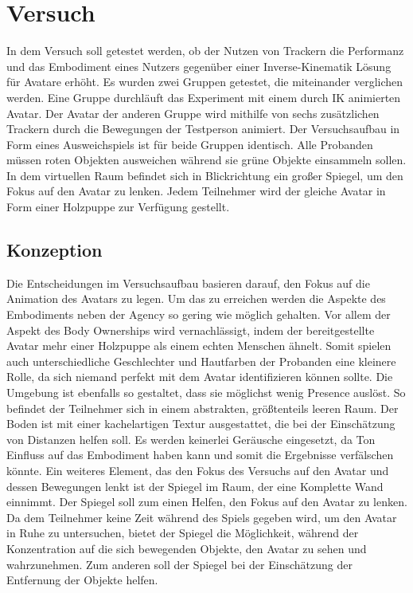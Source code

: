 \chapter{Versuch}
In dem Versuch soll getestet werden, ob der Nutzen von Trackern die Performanz und das Embodiment eines Nutzers gegenüber einer Inverse-Kinematik Lösung für Avatare erhöht. Es wurden zwei Gruppen getestet, die miteinander verglichen werden. Eine Gruppe durchläuft das Experiment mit einem durch IK animierten Avatar. Der Avatar der anderen Gruppe wird mithilfe von sechs zusätzlichen Trackern durch die Bewegungen der Testperson animiert. 
Der Versuchsaufbau in Form eines Ausweichspiels ist für beide Gruppen identisch. Alle Probanden müssen roten Objekten ausweichen während sie grüne Objekte einsammeln sollen. In dem virtuellen Raum befindet sich in Blickrichtung ein großer Spiegel, um den Fokus auf den Avatar zu lenken.
Jedem Teilnehmer wird der gleiche Avatar in Form einer Holzpuppe zur Verfügung gestellt.


\section{Konzeption}
Die Entscheidungen im Versuchsaufbau basieren darauf, den Fokus auf die Animation des Avatars zu legen. Um das zu erreichen werden die Aspekte des Embodiments neben der Agency so gering wie möglich gehalten. Vor allem der Aspekt des Body Ownerships wird vernachlässigt, indem der bereitgestellte Avatar mehr einer Holzpuppe als einem echten Menschen ähnelt. Somit spielen auch unterschiedliche Geschlechter und Hautfarben der Probanden eine kleinere Rolle, da sich niemand perfekt mit dem Avatar identifizieren können sollte. Die Umgebung ist ebenfalls so gestaltet, dass sie möglichst wenig Presence auslöst. So befindet der Teilnehmer sich in einem abstrakten, größtenteils leeren Raum. Der Boden ist mit einer kachelartigen Textur ausgestattet, die bei der Einschätzung von Distanzen helfen soll. Es werden keinerlei Geräusche eingesetzt, da Ton Einfluss auf das Embodiment haben kann und somit die Ergebnisse verfälschen könnte. 
Ein weiteres Element, das den Fokus des Versuchs auf den Avatar und dessen Bewegungen lenkt ist der Spiegel im Raum, der eine Komplette Wand einnimmt. Der Spiegel soll zum einen Helfen, den Fokus auf den Avatar zu lenken. Da dem Teilnehmer keine Zeit während des Spiels gegeben wird, um den Avatar in Ruhe zu untersuchen, bietet der Spiegel die Möglichkeit, während der Konzentration auf die sich bewegenden Objekte, den Avatar zu sehen und wahrzunehmen. Zum anderen soll der Spiegel bei der Einschätzung der Entfernung der Objekte helfen.

